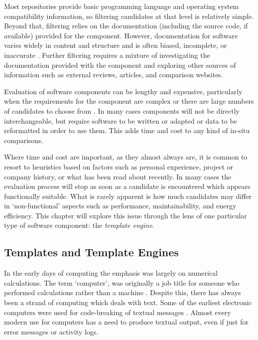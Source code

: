 Most repositories provide basic programming language and operating system compatibility information, so filtering candidates at that level is relatively simple. Beyond that, filtering relies on the documentation (including the source code, if available) provided for the component. However, documentation for software varies widely in content and structure and is often biased, incomplete, or inaccurate \citep{Bertoa2003}. Further filtering requires a mixture of investigating the documentation provided with the component and exploring other sources of information such as external reviews, articles, and comparison websites.

Evaluation of software components can be lengthy and expensive, particularly when the requirements for the component are complex or there are large numbers of candidates to choose from \citep{Badampudi2016}. In many cases components will not be directly interchangeable, but require software to be written or adapted or data to be reformatted in order to use them. This adds time and cost to any kind of in-situ comparisons.

Where time and cost are important, as they almost always are, it is common to resort to heuristics based on factors such as personal experience, project or company history, or what has been read about recently. In many cases the evaluation process will stop as soon as a candidate is encountered which appears functionally suitable. What is rarely apparent is how much candidates may differ in `non-functional' aspects such as performance, maintainability, and energy efficiency. This chapter will explore this issue through the lens of one particular type of software component: the \emph{template engine}.

\subsection{Templates and Template Engines}
\label{templates and engines}

In the early days of computing the emphasis was largely on numerical calculations. The term `computer', was originally a job title for someone who performed calculations rather than a machine \citep{NASA2016}. Despite this, there has always been a strand of computing which deals with text. Some of the earliest electronic computers were used for code-breaking of textual messages \citep{Copeland2004}.  Almost every modern use for computers has a need to produce textual output, even if just for error messages or activity logs. 

